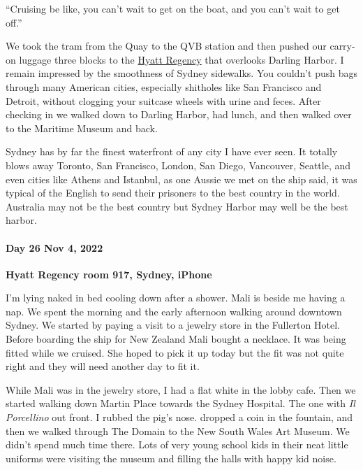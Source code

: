 ``Cruising be like, you can't wait to get on the boat, and you can't
wait to get off.''

We took the tram from the Quay to the QVB station and then pushed our
carry-on luggage three blocks to the \href{https://www.hyatt.com/en-US/hotel/australia/hyatt-regency-sydney/sydrs}{Hyatt Regency} that overlooks
Darling Harbor. I remain impressed by the smoothness of Sydney
sidewalks. You couldn't push bags through many American cities,
especially shitholes like San Francisco and Detroit, without clogging
your suitcase wheels with urine and feces. After checking in we walked
down to Darling Harbor, had lunch, and then walked over to the Maritime
Museum and back.

Sydney has by far the finest waterfront of any city I have ever seen. It
totally blows away Toronto, San Francisco, London, San Diego, Vancouver,
Seattle, and even cities like Athens and Istanbul, as one Aussie we met
on the ship said, it was typical of the English to send their prisoners
to the best country in the world. Australia may not be the best country
but Sydney Harbor may well be the best harbor.

\hypertarget{day-26-nov-4-2022-hyatt-regency-room-917-sydney-iphone}{%
\paragraph{\texorpdfstring{\textbf{Day 26 Nov 4, 2022}}{Day 26 Nov 4, 2022}}\label{day-26-nov-4-2022-hyatt-regency-room-917-sydney-iphone}}

\textbf{Hyatt Regency room 917, Sydney, iPhone}

I'm lying naked in bed cooling down after a shower. Mali is beside me
having a nap. We spent the morning and the early afternoon walking
around downtown Sydney. We started by paying a visit to a jewelry store
in the Fullerton Hotel. Before boarding the ship for New Zealand Mali bought a necklace. It was being fitted while we
cruised. She hoped to pick it up today but the fit was not quite right
and they will need another day to fit it.

While Mali was in the jewelry store, I had a flat white in the lobby
cafe. Then we started walking down Martin Place towards the Sydney
Hospital. The one with \emph{Il Porcellino} out front. I rubbed the
pig's nose. dropped a coin in the fountain, and then we walked through
The Domain to the New South Wales Art Museum. We didn't spend much time
there. Lots of very young school kids in their neat little uniforms were
visiting the museum and filling the halls with happy kid noise.


